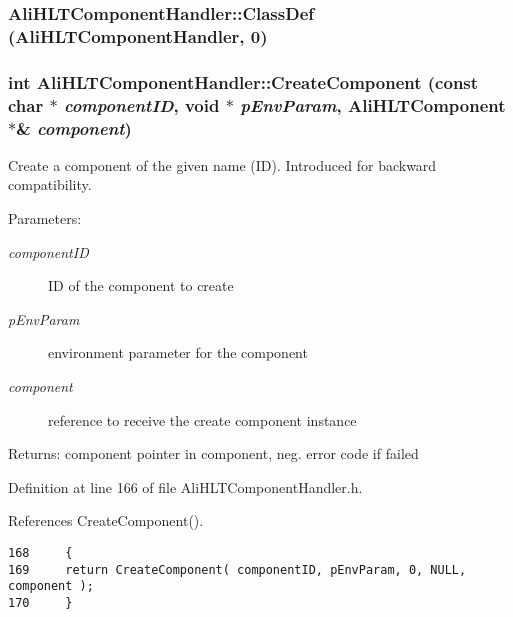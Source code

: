 \subsubsection{\setlength{\rightskip}{0pt plus 5cm}Ali\-HLTComponent\-Handler::Class\-Def ({\bf Ali\-HLTComponent\-Handler}, 0)\hspace{0.3cm}{\tt  [private]}}\label{classAliHLTComponentHandler_d6}


\subsubsection{\setlength{\rightskip}{0pt plus 5cm}int Ali\-HLTComponent\-Handler::Create\-Component (const char $\ast$ {\em component\-ID}, void $\ast$ {\em p\-Env\-Param}, {\bf Ali\-HLTComponent} $\ast$\& {\em component})\hspace{0.3cm}{\tt  [inline]}}\label{classAliHLTComponentHandler_a16}


Create a component of the given name (ID). Introduced for backward compatibility. \begin{Desc}
\item[Parameters:]
\begin{description}
\item[{\em component\-ID}]ID of the component to create \item[{\em p\-Env\-Param}]environment parameter for the component \item[{\em component}]reference to receive the create component instance \end{description}
\end{Desc}
\begin{Desc}
\item[Returns:]component pointer in component, neg. error code if failed \end{Desc}


Definition at line 166 of file Ali\-HLTComponent\-Handler.h.

References Create\-Component().

\footnotesize\begin{verbatim}168     {
169     return CreateComponent( componentID, pEnvParam, 0, NULL, component );
170     }
\end{verbatim}\normalsize 


